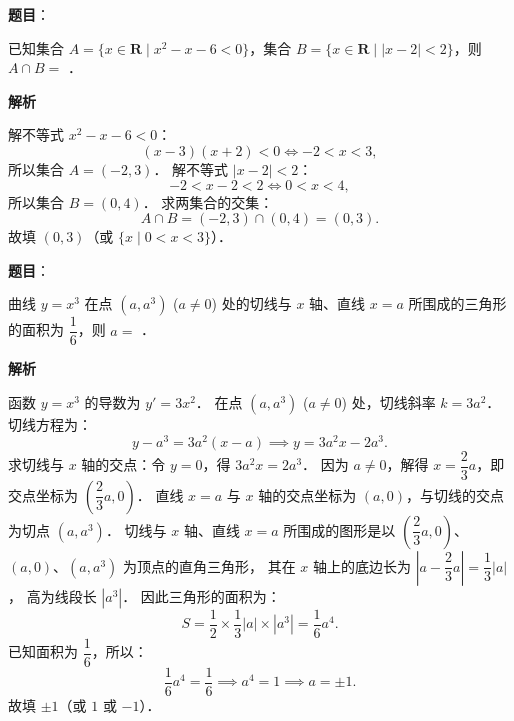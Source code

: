 \begin{answer}

\textbf{题目}：

已知集合 $A = \{x \in \mathbf{R} \mid x^2 - x - 6 < 0\}$，集合 $B = \{x \in \mathbf{R} \mid |x - 2| < 2\}$，则 $A \cap B =$ \gkblank{}．

\textbf{解析}

解不等式 $x^2 - x - 6 < 0$：
\nopagebreak[4]
\[
(x - 3)(x + 2) < 0 \iff -2 < x < 3,
\]
所以集合 $A = (-2, 3)$．
解不等式 $|x - 2| < 2$：
\nopagebreak[4]
\[
-2 < x - 2 < 2 \iff 0 < x < 4,
\]
所以集合 $B = (0, 4)$．
求两集合的交集：
\nopagebreak[4]
\[
A \cap B = (-2, 3) \cap (0, 4) = (0, 3).
\]
故填 $(0, 3)$（或 $\{x \mid 0 < x < 3\}$）．


\end{answer}
\begin{answer}

\textbf{题目}：

曲线 $y = x^3$ 在点 $(a, a^3)$ ($a \neq 0$) 处的切线与 $x$ 轴、直线 $x = a$ 所围成的三角形的面积为 $\dfrac{1}{6}$，则 $a =$ \gkblank{}．

\textbf{解析}

函数 $y = x^3$ 的导数为 $y' = 3x^2$．
在点 $(a, a^3)$ ($a \neq 0$) 处，切线斜率 $k = 3a^2$．
切线方程为：
\nopagebreak[4]
\[
y - a^3 = 3a^2(x - a) \implies y = 3a^2 x - 2a^3.
\]
求切线与 $x$ 轴的交点：令 $y = 0$，得 $3a^2 x = 2a^3$．
因为 $a \neq 0$，解得 $x = \dfrac{2}{3}a$，即交点坐标为 $\left(\dfrac{2}{3}a, 0\right)$．
直线 $x = a$ 与 $x$ 轴的交点坐标为 $(a, 0)$，与切线的交点为切点 $(a, a^3)$．
切线与 $x$ 轴、直线 $x = a$ 所围成的图形是以 $\left(\dfrac{2}{3}a, 0\right)$、$(a, 0)$、$(a, a^3)$ 为顶点的直角三角形，
其在 $x$ 轴上的底边长为 $\left|a - \dfrac{2}{3}a\right| = \dfrac{1}{3}|a|$，
高为线段长 $|a^3|$．
因此三角形的面积为：
\nopagebreak[4]
\[
S = \frac{1}{2} \times \frac{1}{3}|a| \times |a^3| = \frac{1}{6} a^4.
\]
已知面积为 $\dfrac{1}{6}$，所以：
\nopagebreak[4]
\[
\frac{1}{6} a^4 = \frac{1}{6} \implies a^4 = 1 \implies a = \pm 1.
\]
故填 $\pm 1$（或 $1$ 或 $-1$）．


\end{answer}
